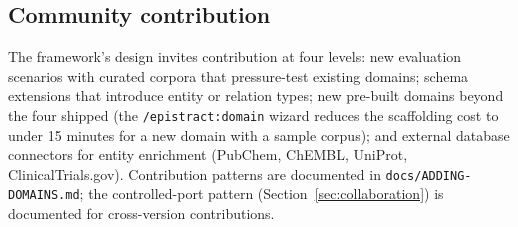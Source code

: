 \subsection{Community contribution}

The framework's design invites contribution at four levels: new evaluation scenarios with curated corpora that pressure-test existing domains; schema extensions that introduce entity or relation types; new pre-built domains beyond the four shipped (the \texttt{/epistract:domain} wizard reduces the scaffolding cost to under 15 minutes for a new domain with a sample corpus); and external database connectors for entity enrichment (PubChem, ChEMBL, UniProt, ClinicalTrials.gov). Contribution patterns are documented in \texttt{docs/ADDING-DOMAINS.md}; the controlled-port pattern (Section~\ref{sec:collaboration}) is documented for cross-version contributions.
